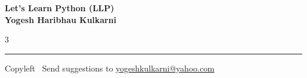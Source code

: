 \documentclass[8pt,landscape]{article}
\begin{document}
\footnotesize


\begin{center}
\Large{\textbf{Let's Learn Python (LLP)\\ Yogesh Haribhau Kulkarni}}  
\end{center}

\begin{multicols}{3}

\end{multicols}

\rule{\linewidth}{0.25pt}
\scriptsize
Copyleft \textcopyleft\  Send suggestions to 
\href{http://www.yogeshkulkarni.com}{yogeshkulkarni@yahoo.com}
\end{document}
